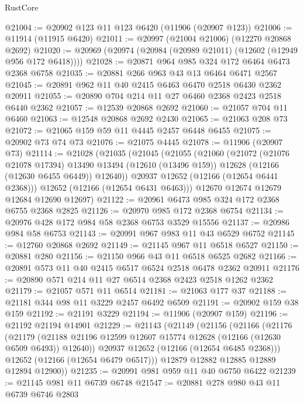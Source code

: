 \begin{lexlean}{RustCore}
\begin{coremodule}
@21004 := @20902 @123 @11 @123 @6420 (@11906 (@20907 @123))
@21006 := @11914 (@11915 @6420)
@21011 := @20997 (@21004 @21006) (@12270 @20868 @2692)
@21020 := @20969 (@20974 (@20984 (@20989 @21011) (@12602 (@12949 @956 @172 @6418))))
@21028 := @20871 @964 @985 @324 @172 @6464 @6473 @2368 @6758
@21035 := @20881 @266 @963 @43 @13 @6464 @6471 @2567
@21045 := @20891 @962 @11 @40 @2415 @6463 @6470 @2518 @6430 @2362 @20911
@21055 := @20890 @704 @214 @11 @27 @6460 @2368 @2423 @2518 @6440 @2362
@21057 := @12539 @20868 @2692
@21060 := @21057 @704 @11 @6460
@21063 := @12548 @20868 @2692 @2430
@21065 := @21063 @208 @73
@21072 := @21065 @159 @59 @11 @4445 @2457 @6448 @6455
@21075 := @20902 @73 @74 @73
@21076 := @21075 @4445
@21078 := @11906 (@20907 @73)
@21114 := @21028
    (@21035
      (@21045
        (@21055
          (@21060
            (@21072
              (@21076 @21078 @17394)
              @13490
              @13494
              (@12610 (@13496 @159))
              @12628
              (@12166 (@12630 @6455 @6449))
              @12640))
          @20937
          @12652
          (@12166 (@12654 @6441 @2368)))
        @12652
        (@12166 (@12654 @6431 @6463)))
      @12670
      @12674
      @12679
      @12684
      @12690
      @12697)
@21122 := @20961 @6473 @985 @324 @172 @2368 @6755 @2368 @2825
@21126 := @20970 @985 @172 @2368 @6754
@21134 := @20976 @428 @172 @984 @58 @2368 @6753 @3529 @15556
@21137 := @20986 @984 @58 @6753
@21143 := @20991 @967 @983 @11 @43 @6529 @6752
@21145 := @12760 @20868 @2692
@21149 := @21145 @967 @11 @6518 @6527
@21150 := @20881 @280
@21156 := @21150 @966 @43 @11 @6518 @6525 @2682
@21166 := @20891 @573 @11 @40 @2415 @6517 @6524 @2518 @6478 @2362 @20911
@21176 := @20890 @571 @214 @11 @27 @6514 @2368 @2423 @2518 @1262 @2362
@21179 := @21057 @571 @11 @6514
@21181 := @21063 @177 @37
@21188 := @21181 @344 @98 @11 @3229 @2457 @6492 @6509
@21191 := @20902 @159 @38 @159
@21192 := @21191 @3229
@21194 := @11906 (@20907 @159)
@21196 := @21192 @21194 @14901
@21229 := @21143
    (@21149
      (@21156
        (@21166
          (@21176
            (@21179
              (@21188 @21196 @12599 @12607 @15774 @12628 (@12166 (@12630 @6509 @6493)) @12640))
            @20937
            @12652
            (@12166 (@12654 @6485 @2368)))
          @12652
          (@12166 (@12654 @6479 @6517)))
        @12879
        @12882
        @12885
        @12889
        @12894
        @12900))
@21235 := @20991 @981 @959 @11 @40 @6750 @6422
@21239 := @21145 @981 @11 @6739 @6748
@21547 := @20881
    @278
    @980
    @43
    @11
    @6739
    @6746
    @2803

\end{coremodule}
\end{lexlean}
